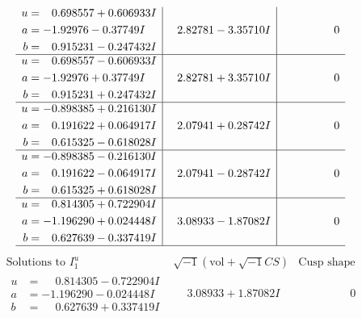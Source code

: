 \documentclass[1p]{elsarticle_modified}
\theoremstyle{definition}
\newcommand{\I}{\sqrt{-1}}
\begin{document}
$$\begin{array}{c|c|c}
\begin{aligned}
u &= \phantom{-}0.698557 + 0.606933 I \\
a &= -1.92976 - 0.37749 I \\
b &= \phantom{-}0.915231 - 0.247432 I\end{aligned}
 & \phantom{-}2.82781 - 3.35710 I & \phantom{-0.000000 } 0 \\ \hline\begin{aligned}
u &= \phantom{-}0.698557 - 0.606933 I \\
a &= -1.92976 + 0.37749 I \\
b &= \phantom{-}0.915231 + 0.247432 I\end{aligned}
 & \phantom{-}2.82781 + 3.35710 I & \phantom{-0.000000 } 0 \\ \hline\begin{aligned}
u &= -0.898385 + 0.216130 I \\
a &= \phantom{-}0.191622 + 0.064917 I \\
b &= \phantom{-}0.615325 - 0.618028 I\end{aligned}
 & \phantom{-}2.07941 + 0.28742 I & \phantom{-0.000000 } 0 \\ \hline\begin{aligned}
u &= -0.898385 - 0.216130 I \\
a &= \phantom{-}0.191622 - 0.064917 I \\
b &= \phantom{-}0.615325 + 0.618028 I\end{aligned}
 & \phantom{-}2.07941 - 0.28742 I & \phantom{-0.000000 } 0 \\ \hline\begin{aligned}
u &= \phantom{-}0.814305 + 0.722904 I \\
a &= -1.196290 + 0.024448 I \\
b &= \phantom{-}0.627639 - 0.337419 I\end{aligned}
 & \phantom{-}3.08933 - 1.87082 I & \phantom{-0.000000 } 0\\
 \hline 
 \end{array}$$\newpage$$\begin{array}{c|c|c}  
\text{Solutions to }I^u_{1}& \I (\text{vol} + \sqrt{-1}CS) & \text{Cusp shape}\\
 \hline 
\begin{aligned}
u &= \phantom{-}0.814305 - 0.722904 I \\
a &= -1.196290 - 0.024448 I \\
b &= \phantom{-}0.627639 + 0.337419 I\end{aligned}
 & \phantom{-}3.08933 + 1.87082 I & \phantom{-0.000000 } 0 \\ \hline\begin{aligned}

\end{aligned}
\end{array}$$
\end{document}
